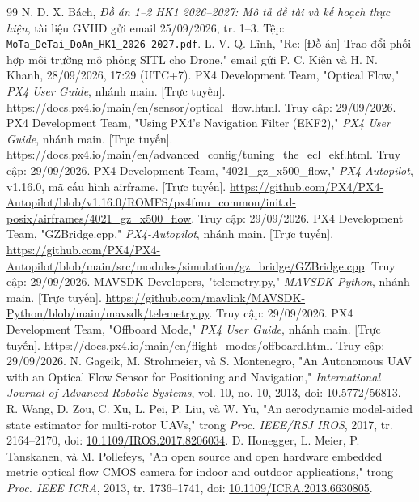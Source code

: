 \documentclass[a4paper,12pt]{article}
\newcommand{\code}[1]{\texttt{#1}}
\begin{document}
\clearpage
{}
\begingroup{}\fontsize{13}{16}\selectfont
\begin{thebibliography}{99}
 N. D. X. Bách, \textit{Đồ án 1–2 HK1 2026–2027: Mô tả đề tài và kế hoạch thực hiện}, tài liệu GVHD gửi email 25/09/2026, tr. 1–3. Tệp: \code{MoTa\_DeTai\_DoAn\_HK1\_2026-2027.pdf}.
 L. V. Q. Lĩnh, "Re: [Đồ án] Trao đổi phối hợp môi trường mô phỏng SITL cho Drone," email gửi P. C. Kiên và H. N. Khanh, 28/09/2026, 17:29 (UTC+7).
 PX4 Development Team, "Optical Flow," \textit{PX4 User Guide}, nhánh main. [Trực tuyến]. \url{https://docs.px4.io/main/en/sensor/optical_flow.html}. Truy cập: 29/09/2026.
 PX4 Development Team, "Using PX4's Navigation Filter (EKF2)," \textit{PX4 User Guide}, nhánh main. [Trực tuyến]. \url{https://docs.px4.io/main/en/advanced_config/tuning_the_ecl_ekf.html}. Truy cập: 29/09/2026.
 PX4 Development Team, "4021\_gz\_x500\_flow," \textit{PX4-Autopilot}, v1.16.0, mã cấu hình airframe. [Trực tuyến]. \url{https://github.com/PX4/PX4-Autopilot/blob/v1.16.0/ROMFS/px4fmu_common/init.d-posix/airframes/4021_gz_x500_flow}. Truy cập: 29/09/2026.
 PX4 Development Team, "GZBridge.cpp," \textit{PX4-Autopilot}, nhánh main. [Trực tuyến]. \url{https://github.com/PX4/PX4-Autopilot/blob/main/src/modules/simulation/gz_bridge/GZBridge.cpp}. Truy cập: 29/09/2026.
 MAVSDK Developers, "telemetry.py," \textit{MAVSDK-Python}, nhánh main. [Trực tuyến]. \url{https://github.com/mavlink/MAVSDK-Python/blob/main/mavsdk/telemetry.py}. Truy cập: 29/09/2026.
 PX4 Development Team, "Offboard Mode," \textit{PX4 User Guide}, nhánh main. [Trực tuyến]. \url{https://docs.px4.io/main/en/flight_modes/offboard.html}. Truy cập: 29/09/2026.
 N. Gageik, M. Strohmeier, và S. Montenegro, "An Autonomous UAV with an Optical Flow Sensor for Positioning and Navigation," \textit{International Journal of Advanced Robotic Systems}, vol. 10, no. 10, 2013, doi: \href{https://doi.org/10.5772/56813}{10.5772/56813}.
 R. Wang, D. Zou, C. Xu, L. Pei, P. Liu, và W. Yu, "An aerodynamic model-aided state estimator for multi-rotor UAVs," trong \textit{Proc. IEEE/RSJ IROS}, 2017, tr. 2164–2170, doi: \href{https://doi.org/10.1109/IROS.2017.8206034}{10.1109/IROS.2017.8206034}.
 D. Honegger, L. Meier, P. Tanskanen, và M. Pollefeys, "An open source and open hardware embedded metric optical flow CMOS camera for indoor and outdoor applications," trong \textit{Proc. IEEE ICRA}, 2013, tr. 1736–1741, doi: \href{https://doi.org/10.1109/ICRA.2013.6630805}{10.1109/ICRA.2013.6630805}.

\end{thebibliography}
\end{document}
